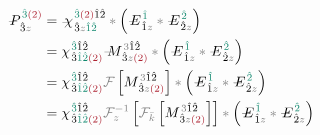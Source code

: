 \begin{subequations} \label{eq:DP^(2)-3_12-C}
\begin{align}
	\Xint{\mathcolor{gray}{-}}{30}{P}^{\;\! \textcolor{PineGreen}{\hat{3}} \textcolor{Maroon}{(2)} }_{\;\! \hat{3}\mathcolor{gray}{z}} &= \Xint{{}^{}_{\mathcolor{gray}{-}}}{23}{\chi}^{\;\! \textcolor{PineGreen}{\hat{3}} \textcolor{Maroon}{(2)} \hat{1} \hat{2} }_{\;\! \hat{3} \mathcolor{gray}{z} \textcolor{PineGreen}{\hat{1} \hat{2}}} \mathcolor{gray}{*} \left( \Xint{\mathcolor{gray}{-}}{295}{E}^{\;\! \textcolor{PineGreen}{\hat{1}}}_{\;\! \hat{1} \mathcolor{gray}{z}} \mathcolor{gray}{*} \Xint{\mathcolor{gray}{-}}{295}{E}^{\;\! \textcolor{PineGreen}{\hat{2}}}_{\;\! \hat{2} \mathcolor{gray}{z}} \right) \label{eq:DP^(2)-3_12-C1} \\
	&= {\chi}^{\;\! \textcolor{PineGreen}{\hat{3}} \hat{1} \hat{2} }_{\;\! \hat{3} \textcolor{PineGreen}{\hat{1} \hat{2}} \textcolor{Maroon}{(2)}} \Xint{\mathcolor{gray}{-}}{18}{M}^{\;\! \mathcolor{gray}{3} \hat{1} \hat{2} }_{\;\! \hat{3} \mathcolor{gray}{z} \textcolor{Maroon}{(2)} } \mathcolor{gray}{*} \left( \Xint{\mathcolor{gray}{-}}{295}{E}^{\;\! \textcolor{PineGreen}{\hat{1}}}_{\;\! \hat{1} \mathcolor{gray}{z}} \mathcolor{gray}{*} \Xint{\mathcolor{gray}{-}}{295}{E}^{\;\! \textcolor{PineGreen}{\hat{2}}}_{\;\! \hat{2} \mathcolor{gray}{z}} \right) \label{eq:DP^(2)-3_12-C2} \\
	&= {\chi}^{\;\! \textcolor{PineGreen}{\hat{3}} \hat{1} \hat{2} }_{\;\! \hat{3} \textcolor{PineGreen}{\hat{1} \hat{2}} \textcolor{Maroon}{(2)}} \mathcolor{gray}{\mathcal F} \left[ M^{\;\! \mathcolor{gray}{3} \hat{1} \hat{2} }_{\;\! \hat{3} \mathcolor{gray}{z} \textcolor{Maroon}{(2)} } \right] \mathcolor{gray}{*} \left( \Xint{\mathcolor{gray}{-}}{295}{E}^{\;\! \textcolor{PineGreen}{\hat{1}}}_{\;\! \hat{1} \mathcolor{gray}{z}} \mathcolor{gray}{*} \Xint{\mathcolor{gray}{-}}{295}{E}^{\;\! \textcolor{PineGreen}{\hat{2}}}_{\;\! \hat{2} \mathcolor{gray}{z}} \right) \label{eq:DP^(2)-3_12-C3} \\
	&= {\chi}^{\;\! \textcolor{PineGreen}{\hat{3}} \hat{1} \hat{2} }_{\;\! \hat{3} \textcolor{PineGreen}{\hat{1} \hat{2}} \textcolor{Maroon}{(2)}} \mathcolor{gray}{\mathcal F_{z}^{-1}} \left[ \mathcolor{gray}{\mathcal F_{\bar{k}}} \left[ M^{\;\! \mathcolor{gray}{3} \hat{1} \hat{2} }_{\;\! \hat{3} \mathcolor{gray}{z} \textcolor{Maroon}{(2)} } \right] \right] \mathcolor{gray}{*} \left( \Xint{\mathcolor{gray}{-}}{295}{E}^{\;\! \textcolor{PineGreen}{\hat{1}}}_{\;\! \hat{1} \mathcolor{gray}{z}} \mathcolor{gray}{*} \Xint{\mathcolor{gray}{-}}{295}{E}^{\;\! \textcolor{PineGreen}{\hat{2}}}_{\;\! \hat{2} \mathcolor{gray}{z}} \right) \label{eq:DP^(2)-3_12-C4} \\

\end{align}
\end{subequations}
